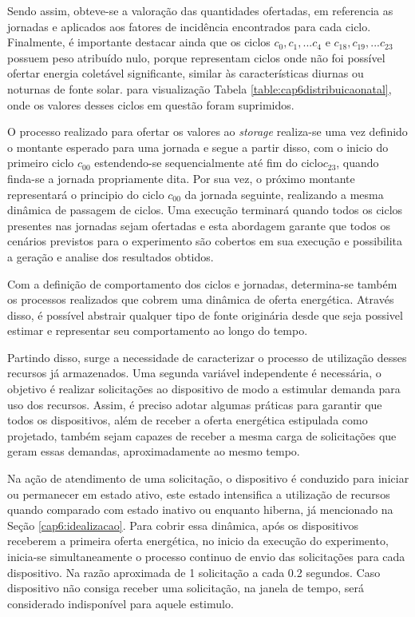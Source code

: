 Sendo assim, obteve-se a valoração das quantidades ofertadas, em referencia as jornadas e aplicados aos fatores de incidência encontrados para cada ciclo. Finalmente, é importante destacar ainda que os ciclos $c_0, c_1,... c_4$ e $c_{18}, c_{19},... c_{23}$ possuem peso atribuído nulo, porque representam ciclos onde não foi possível ofertar energia coletável significante, similar às características diurnas ou noturnas de fonte solar. para visualização Tabela \ref{table:cap6distribuicaonatal}, onde os valores desses ciclos em questão foram suprimidos.

O processo realizado para ofertar os valores ao \textit{storage} realiza-se uma vez definido o montante esperado para uma jornada e segue a partir disso, com o inicio do primeiro ciclo $c_{00}$ estendendo-se sequencialmente até fim do ciclo$c_{23}$, quando finda-se a jornada propriamente dita. Por sua vez, o próximo montante representará o principio do ciclo $c_{00}$ da jornada seguinte, realizando a mesma dinâmica de passagem de ciclos. Uma execução terminará quando todos os ciclos presentes nas jornadas sejam ofertadas e esta abordagem garante que todos os cenários previstos para o experimento são cobertos em sua execução e possibilita a geração e analise dos resultados obtidos.


Com a definição de comportamento dos ciclos e jornadas, determina-se também os processos realizados que cobrem uma dinâmica de oferta energética. Através disso, é possível abstrair qualquer tipo de fonte originária desde que seja possivel estimar e representar seu comportamento ao longo do tempo.

Partindo disso, surge a necessidade de caracterizar o processo de utilização desses recursos já armazenados. Uma segunda variável independente é necessária, o objetivo é realizar solicitações ao dispositivo de modo a estimular demanda para uso dos recursos. Assim, é preciso adotar algumas práticas para garantir que todos os dispositivos, além de receber a oferta energética estipulada como projetado, também sejam capazes de receber a mesma carga de solicitações que geram essas demandas, aproximadamente ao mesmo tempo. 

Na ação de atendimento de uma solicitação, o dispositivo é conduzido para iniciar ou permanecer em estado ativo, este estado intensifica a utilização de recursos quando comparado com estado inativo ou enquanto hiberna, já mencionado na Seção \ref{cap6:idealizacao}. Para cobrir essa dinâmica, após os dispositivos receberem a primeira oferta energética, no inicio da execução do experimento, inicia-se simultaneamente o processo continuo de envio das solicitações para cada dispositivo. Na razão aproximada de 1 solicitação a cada 0.2 segundos. Caso dispositivo não consiga receber uma solicitação, na janela de tempo, será considerado indisponível para aquele estimulo. 

